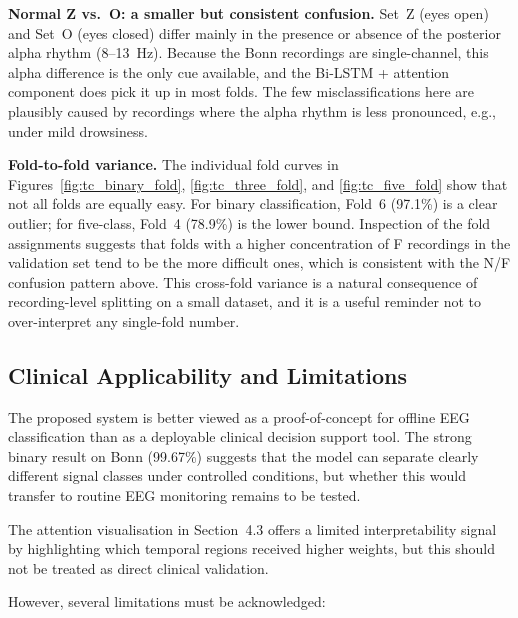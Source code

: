 \textbf{Normal Z vs.\ O: a smaller but consistent confusion.} Set~Z (eyes open) and Set~O (eyes closed) differ mainly in the presence or absence of the posterior alpha rhythm (8--13~Hz). Because the Bonn recordings are single-channel, this alpha difference is the only cue available, and the Bi-LSTM + attention component does pick it up in most folds. The few misclassifications here are plausibly caused by recordings where the alpha rhythm is less pronounced, e.g., under mild drowsiness.

\textbf{Fold-to-fold variance.} The individual fold curves in Figures~\ref{fig:tc_binary_fold}, \ref{fig:tc_three_fold}, and \ref{fig:tc_five_fold} show that not all folds are equally easy. For binary classification, Fold~6 (97.1\%) is a clear outlier; for five-class, Fold~4 (78.9\%) is the lower bound. Inspection of the fold assignments suggests that folds with a higher concentration of F recordings in the validation set tend to be the more difficult ones, which is consistent with the N/F confusion pattern above. This cross-fold variance is a natural consequence of recording-level splitting on a small dataset, and it is a useful reminder not to over-interpret any single-fold number.

\subsection{Clinical Applicability and Limitations}

The proposed system is better viewed as a proof-of-concept for offline EEG classification than as a deployable clinical decision support tool. The strong binary result on Bonn (99.67\%) suggests that the model can separate clearly different signal classes under controlled conditions, but whether this would transfer to routine EEG monitoring remains to be tested.

The attention visualisation in Section~4.3 offers a limited interpretability signal by highlighting which temporal regions received higher weights, but this should not be treated as direct clinical validation.

However, several limitations must be acknowledged:

